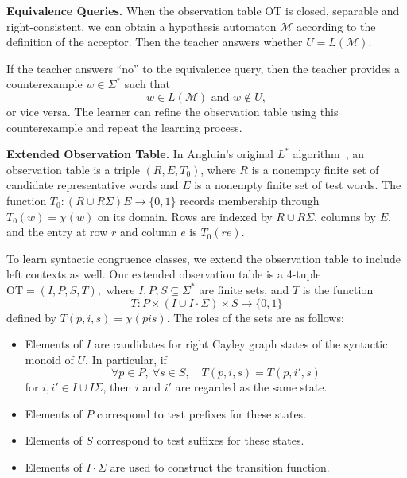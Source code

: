 \documentclass{ieice-tecrep}
\providecommand{\tightlist}{}
\begin{document}
\textbf{Equivalence Queries.} When the observation table \(\mathrm{OT}\) is closed, separable and right-consistent, we can obtain a hypothesis
automaton \(\mathcal{M}\) according to the definition of the acceptor.
Then the teacher answers whether \(U = L(\mathcal{M})\).

If the teacher answers ``no'' to the equivalence query, then the teacher provides a counterexample \(w \in \Sigma^*\) such that
\[
w \in L(\mathcal{M}) \text{ and } w \notin U,
\]
or vice versa. The learner can refine the observation table using this counterexample and repeat the learning process.

\textbf{Extended Observation Table.} In Angluin's original \(L^*\) algorithm~\cite{angluin87}, an
observation table is a triple \((R,E,T_0)\), where \(R\) is a
nonempty finite set of candidate representative words and \(E\) is a
nonempty finite set of test words. The function
\(T_0:(R\cup R\Sigma)E\to\{0,1\}\) records membership through
\(T_0(w)=\chi(w)\) on its domain.
Rows are indexed by \(R\cup R\Sigma\), columns by \(E\), and
the entry at row \(r\) and column \(e\) is \(T_0(re)\).

To learn syntactic congruence classes, we extend the observation table
to include left contexts as well. Our extended observation table
is a 4-tuple
\(
\mathrm{OT} = (I,P,S,T),
\)
where  \(I,P,S \subseteq \Sigma^*\) are finite sets, and \(T\) is the function
\[
T : P\times( I \cup I \cdot \Sigma) \times S \to \{0,1\}
\]
defined by \(T(p,i,s)=\chi(pis)\). The roles of the sets are as follows:

\begin{itemize}
\tightlist
\item
  Elements of \(I\) are candidates for right Cayley graph states of the syntactic monoid of \(U\).
  In particular, if
  \[
  \forall p\in P,\ \forall s\in S,\quad
  T(p,i,s) = T(p,i',s)
  \]
  for \(i,i'\in I\cup I\Sigma\),
  then \(i\) and \(i'\) are regarded as the same state.
\item
  Elements of \(P\) correspond to test prefixes for these states.
\item
  Elements of \(S\) correspond to test suffixes for these states.
\item
  Elements of \(I \cdot \Sigma\) are used to construct the transition
  function.
\end{itemize}
\end{document}

